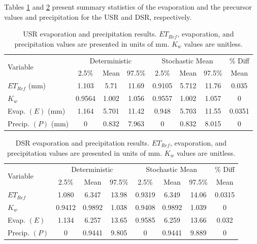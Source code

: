 \begin{linenumbers}
Tables \ref{tab:USRAtmResults} and \ref{tab:DSRAtmResults} present summary statistics of the evaporation and the precursor values and precipitation for the USR and DSR, respectively.

\begin{table}[htbp]
  \centering
  \caption[USR evaporation and precipitation results.]{USR evaporation and precipitation results.  $ET_{Ref}$, evaporation, and precipitation values are presented in units of \si{mm}.  $K_w$ values are unitless.}
  \label{tab:USRAtmResults}
    \begin{tabular}{l|ccc|ccc|c}
    \toprule
    \multirow{2}[0]{*}{Variable} & \multicolumn{3}{c}{Deterministic} & \multicolumn{3}{c}{Stochastic Mean} & \% Diff\\\cline{2-4} \cline{5-7}
    & 2.5\% & Mean & 97.5\% & 2.5\% & Mean & 97.5\% & Mean\\
    \midrule
    \midrule
	$ET_{Ref}$ (mm)&	1.103	&5.71	&11.69	&0.9105	&5.712	&11.76	&0.035	\\
	$K_{w}$&	0.9564	&1.002	&1.056	&0.9557	&1.002	&1.057	&0	\\
	Evap. $(E)$ (mm)&	1.164	&5.701	&11.42	&0.948	&5.703	&11.55	&0.0351	\\
	Precip. $(P)$ (mm)&	0	&0.832	&7.963	&0	&0.832	&8.015	&0	\\
    \bottomrule
    \end{tabular}
\end{table}

\begin{table}[htbp]
  \centering
  \caption[DSR evaporation and precipitation results.]{DSR evaporation and precipitation results.  $ET_{Ref}$, evaporation, and precipitation values are presented in units of \si{mm}.  $K_w$ values are unitless.}
  \label{tab:DSRAtmResults}
    \begin{tabular}{l|ccc|ccc|c}
    \toprule
    \multirow{2}[0]{*}{Variable} & \multicolumn{3}{c}{Deterministic} & \multicolumn{3}{c}{Stochastic Mean} & \% Diff\\\cline{2-4} \cline{5-7}
    & 2.5\% & Mean & 97.5\% & 2.5\% & Mean & 97.5\% & Mean\\
    \midrule
    \midrule
	$ET_{Ref}$&	1.080	&6.347	&13.98	&0.9319	&6.349	&14.06	&0.0315	\\
	$K_{w}$&	0.9412	&0.9892	&1.038	&0.9408	&0.9892	&1.039	&0	\\
	Evap. $(E)$&	1.134	&6.257	&13.65	&0.9585	&6.259	&13.66	&0.032	\\
	Precip. $(P)$&	0	&0.9441	&9.805	&0	&0.9441	&9.889	&0	\\
    \bottomrule
    \end{tabular}
\end{table}
\clearpage


\end{linenumbers}

